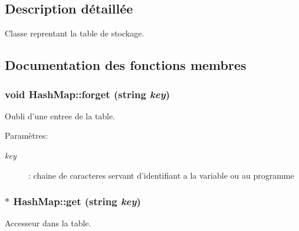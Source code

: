 \subsection{Description détaillée}
Classe reprentant la table de stockage. 

\subsection{Documentation des fonctions membres}
\hypertarget{class_hash_map_32fb1e4adb8f3982861772efa511f7db}{
\subsubsection[{forget}]{\setlength{\rightskip}{0pt plus 5cm}void HashMap::forget (string {\em key})}}
\label{class_hash_map_32fb1e4adb8f3982861772efa511f7db}


Oubli d'une entree de la table. 

\begin{Desc}
\item[Paramètres:]
\begin{description}
\item[{\em key}]: chaine de caracteres servant d'identifiant a la variable ou au programme \end{description}
\end{Desc}
\hypertarget{class_hash_map_28d6dfc1112eb216a754c07255ce0ba3}{
\subsubsection[{get}]{$\ast$ HashMap::get (string {\em key})}}
\label{class_hash_map_28d6dfc1112eb216a754c07255ce0ba3}


Accesseur dans la table. 


